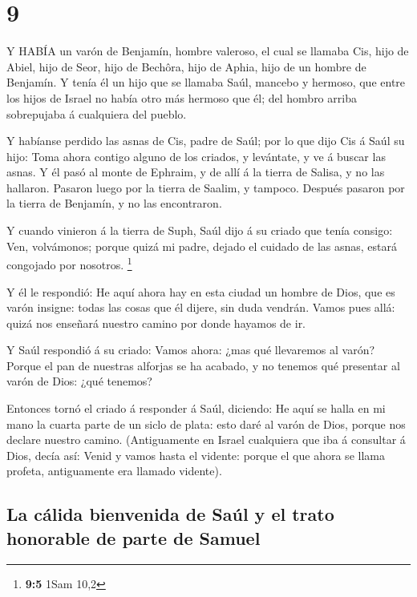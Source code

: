 \hypertarget{section-8}{%
\section{9}\label{section-8}}

 Y HABÍA un varón de Benjamín, hombre valeroso, el cual se
llamaba Cis, hijo de Abiel, hijo de Seor, hijo de Bechôra, hijo de
Aphia, hijo de un hombre de Benjamín.  Y tenía él un hijo
que se llamaba Saúl, mancebo y hermoso, que entre los hijos de Israel no
había otro más hermoso que él; del hombro arriba sobrepujaba á
cualquiera del pueblo.

 Y habíanse perdido las asnas de Cis, padre de Saúl; por lo
que dijo Cis á Saúl su hijo: Toma ahora contigo alguno de los criados, y
levántate, y ve á buscar las asnas.  Y él pasó al monte de
Ephraim, y de allí á la tierra de Salisa, y no las hallaron. Pasaron
luego por la tierra de Saalim, y tampoco. Después pasaron por la tierra
de Benjamín, y no las encontraron.

 Y cuando vinieron á la tierra de Suph, Saúl dijo á su
criado que tenía consigo: Ven, volvámonos; porque quizá mi padre, dejado
el cuidado de las asnas, estará congojado por nosotros. \footnote{\textbf{9:5}
  1Sam 10,2}

 Y él le respondió: He aquí ahora hay en esta ciudad un
hombre de Dios, que es varón insigne: todas las cosas que él dijere, sin
duda vendrán. Vamos pues allá: quizá nos enseñará nuestro camino por
donde hayamos de ir.

 Y Saúl respondió á su criado: Vamos ahora: ¿mas qué
llevaremos al varón? Porque el pan de nuestras alforjas se ha acabado, y
no tenemos qué presentar al varón de Dios: ¿qué tenemos?

 Entonces tornó el criado á responder á Saúl, diciendo: He
aquí se halla en mi mano la cuarta parte de un siclo de plata: esto daré
al varón de Dios, porque nos declare nuestro camino. 
(Antiguamente en Israel cualquiera que iba á consultar á Dios, decía
así: Venid y vamos hasta el vidente: porque el que ahora se llama
profeta, antiguamente era llamado vidente).

\hypertarget{la-cuxe1lida-bienvenida-de-sauxfal-y-el-trato-honorable-de-parte-de-samuel}{%
\subsection{La cálida bienvenida de Saúl y el trato honorable de parte
de
Samuel}\label{la-cuxe1lida-bienvenida-de-sauxfal-y-el-trato-honorable-de-parte-de-samuel}}


